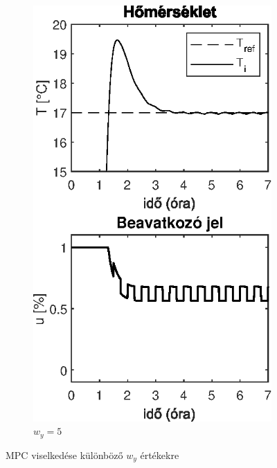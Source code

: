 \begin{figure}[H]
\begin{subfigure}[t]{0.32\textwidth}
		\includegraphics[width=\textwidth]{figures/realsys/mpc-wy-5}
		\caption{$w_y=5$}
		\label{fig:mpc-wy-5}
	\end{subfigure}
	\caption{MPC viselkedése különböző $w_y$ értékekre}
	\label{fig:mpc-wy}
\end{figure}



